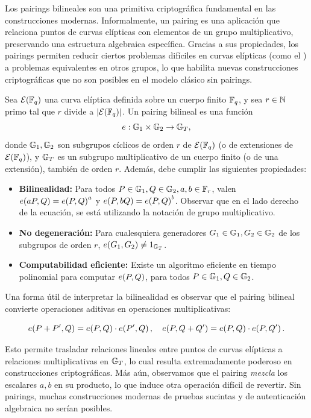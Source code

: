 
Los pairings bilineales son una primitiva criptográfica fundamental en las construcciones modernas. Informalmente, un pairing es una aplicación que relaciona puntos de curvas elípticas con elementos de un grupo multiplicativo, preservando una estructura algebraica específica. Gracias a sus propiedades, los pairings permiten reducir ciertos problemas difíciles en curvas elípticas \cite{Menezes1993} (como el \ECDLP) a problemas equivalentes en otros grupos, lo que habilita nuevas construcciones criptográficas que no son posibles en el modelo clásico sin pairings.

\begin{definition}
\label{def:apendice-a-pairings-pairing-bilineal}
	Sea $\mathcal{E}(\mathbb{F}_q)$ una curva elíptica definida sobre un cuerpo finito $\mathbb{F}_q$, y sea $r \in \mathbb{N}$ primo tal que $r$ divide a $|\mathcal{E}(\mathbb{F}_q)|$. Un pairing bilineal es una función
	\[
	e : \mathbb{G}_1 \times \mathbb{G}_2 \to \mathbb{G}_T,
	\]
	donde $\mathbb{G}_1,\mathbb{G}_2$ son subgrupos cíclicos de orden $r$ de $\mathcal{E}(\mathbb{F}_q)$ (o de extensiones de $\mathcal{E}(\mathbb{F}_q)$), y $\mathbb{G}_T$ es un subgrupo multiplicativo de un cuerpo finito (o de una extensión), también de orden $r$. Además, debe cumplir las siguientes propiedades:
	\begin{itemize}
		\item \textbf{Bilinealidad:} Para todos $P \in \mathbb{G}_1, Q \in \mathbb{G}_2, a,b \in \mathbb{F}_r$, valen $e\!\left(aP,Q\right) = e\!\left(P,Q\right)^a$ y $e\!\left(P,bQ\right) = e\!\left(P,Q\right)^b$. Observar que en el lado derecho de la ecuación, se está utilizando la notación de grupo multiplicativo.
		\item \textbf{No degeneración:} Para cualesquiera generadores $G_1 \in \mathbb{G}_1, G_2 \in \mathbb{G}_2$ de los subgrupos de orden $r$, $e\!\left(G_1,G_2\right) \neq 1_{\mathbb{G}_T}$.
		\item \textbf{Computabilidad eficiente:} Existe un algoritmo eficiente en tiempo polinomial para computar $e\!\left(P,Q\right)$, para todos $P \in \mathbb{G}_1, Q \in \mathbb{G}_2$.
	\end{itemize}
\end{definition}

Una forma útil de interpretar la bilinealidad es observar que el pairing bilineal convierte operaciones aditivas en operaciones multiplicativas:

$$e\!\left(P + P',Q\right)  = e\!\left(P,Q\right) \cdot e\!\left(P',Q\right), \quad e\!\left(P,Q + Q'\right) = e\!\left(P,Q\right) \cdot e\!\left(P,Q'\right).$$

Esto permite trasladar relaciones lineales entre puntos de curvas elípticas a relaciones multiplicativas en $\mathbb{G}_T$, lo cual resulta extremadamente poderoso en construcciones criptográficas. Más aún, observamos que el pairing \textit{mezcla} los escalares $a,b$ en su producto, lo que induce otra operación difícil de revertir. Sin pairings, muchas construcciones modernas de pruebas sucintas y de autenticación algebraica no serían posibles.

